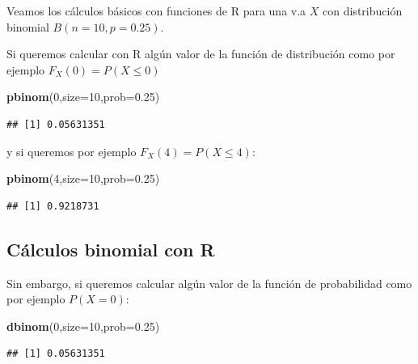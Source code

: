\documentclass[]{book}
\newenvironment{Shaded}{\begin{snugshade}}{\end{snugshade}}
\newcommand{\DataTypeTok}[1]{\textcolor[rgb]{0.13,0.29,0.53}{#1}}
\newcommand{\DecValTok}[1]{\textcolor[rgb]{0.00,0.00,0.81}{#1}}
\newcommand{\FloatTok}[1]{\textcolor[rgb]{0.00,0.00,0.81}{#1}}
\newcommand{\KeywordTok}[1]{\textcolor[rgb]{0.13,0.29,0.53}{\textbf{#1}}}
\newcommand{\NormalTok}[1]{#1}
\begin{document}
Veamos los cálculos básicos con funciones de R para una v.a \(X\) con distribución binomial \(B(n=10,p=0.25)\).

Si queremos calcular con R algún valor de la función de distribución como por ejemplo \(F_X(0)=P(X\leq 0)\)

\begin{Shaded}
\begin{Highlighting}[]
\KeywordTok{pbinom}\NormalTok{(}\DecValTok{0}\NormalTok{,}\DataTypeTok{size=}\DecValTok{10}\NormalTok{,}\DataTypeTok{prob=}\FloatTok{0.25}\NormalTok{)}
\end{Highlighting}
\end{Shaded}

\begin{verbatim}
## [1] 0.05631351
\end{verbatim}

y si queremos por ejemplo \(F_X(4)=P(X\leq 4)\):

\begin{Shaded}
\begin{Highlighting}[]
\KeywordTok{pbinom}\NormalTok{(}\DecValTok{4}\NormalTok{,}\DataTypeTok{size=}\DecValTok{10}\NormalTok{,}\DataTypeTok{prob=}\FloatTok{0.25}\NormalTok{)}
\end{Highlighting}
\end{Shaded}

\begin{verbatim}
## [1] 0.9218731
\end{verbatim}

\hypertarget{cuxe1lculos-binomial-con-r-1}{%
\subsection{Cálculos binomial con R}\label{cuxe1lculos-binomial-con-r-1}}

Sin embargo, si queremos calcular algún valor de la función de probabilidad como por ejemplo \(P(X=0)\):

\begin{Shaded}
\begin{Highlighting}[]
\KeywordTok{dbinom}\NormalTok{(}\DecValTok{0}\NormalTok{,}\DataTypeTok{size=}\DecValTok{10}\NormalTok{,}\DataTypeTok{prob=}\FloatTok{0.25}\NormalTok{)}
\end{Highlighting}
\end{Shaded}

\begin{verbatim}
## [1] 0.05631351
\end{verbatim}
\end{document}

